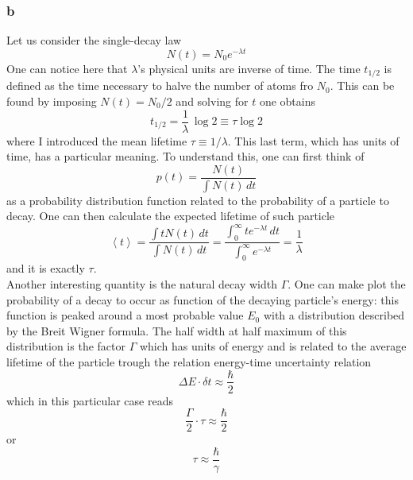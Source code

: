 \subsubsection*{b}
Let us consider the single-decay law 
\begin{equation*}
    N(t) = N_0 e^{-\lambda t}
\end{equation*}
One can notice here that $\lambda$'s physical units are inverse of time. The time $t_{1/2}$ is defined as the time necessary to halve the number of atoms fro $N_0$. 
This can be found by imposing $N(t) = N_0/2$ and solving for $t$ one obtains 
\begin{equation*}
    t_{1/2} = \frac{1}{\lambda} \, \log 2 \equiv \tau \log 2
\end{equation*}
where I introduced the mean lifetime $\tau \equiv 1/\lambda$. This last term, which has units of time, has a particular meaning. To understand this, one can first think 
of 
\begin{equation*}
    p(t) = \frac{N(t)}{\int N(t) \, dt}
\end{equation*} 
as a probability distribution function related to the probability of a particle to decay. One can then calculate the expected lifetime of such particle
\begin{equation*}
    \left\langle t \right\rangle = \frac{\int t N(t) \, dt}{\int N(t) \, dt} = \frac{\int_0^{\infty} te^{-\lambda t} \, dt}{\int_0^{\infty} e^{-\lambda t}} = \frac{1}{\lambda}
\end{equation*}
and it is exactly $\tau$. \\
Another interesting quantity is the natural decay width $\Gamma$. One can make plot the probability of a decay to occur as function of the decaying particle's energy: this function is peaked around
a most probable value $E_0$ with a distribution described by the Breit Wigner formula. The half width at half maximum of this distribution is the factor $\Gamma$ which has units of energy and is related to the average 
lifetime of the particle trough the relation
energy-time uncertainty relation
\begin{equation*}
    \Delta E \cdot \delta t \approx \frac{\hbar}{2}
\end{equation*}
which in this particular case reads
\begin{equation*}
    \frac{\Gamma}{2} \cdot \tau \approx \frac{\hbar}{2}
\end{equation*}
or 
\begin{equation*}
    \tau \approx \frac{\hbar}{\gamma}
\end{equation*}

